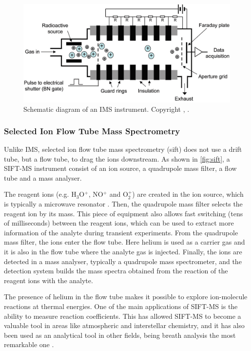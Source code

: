 \begin{figure}%
\centering
    \includegraphics[width=0.65\linewidth]{pics/ims.png}
    \caption{Schematic diagram of an IMS instrument. Copyright \textcopyright  \citeauthor{ellis2013proton},  \citeyear{ellis2013proton}.}
    \label{fig:ims}
\end{figure}












\subsubsection{Selected Ion Flow Tube Mass Spectrometry}
Unlike IMS, selected ion flow tube mass spectrometry (\acrshort{sift}) does not use a drift tube, but a flow tube, to drag the ions downstream. As shown in \autoref{fig:sift}, a SIFT-MS instrument consist of an ion source, a quadrupole mass filter, a flow tube and a mass analyser.

The reagent ions (e.g. H$_3$O$^+$, NO$^+$ and O$_2^+$) are created in the ion source, which is typically a microwave resonator \cite{smith2005selected}.
Then, the quadrupole mass filter  selects the reagent ion by its mass. This piece of equipment also allows fast switching (tens of milliseconds) between the reagent ions, which can be used to extract more information of the analyte during transient experiments. From the quadrupole mass filter, the ions enter the flow tube. Here helium is used as a carrier gas and it is also in the flow tube where the analyte gas is injected. Finally, the ions are detected in a mass analyser, typically a quadrupole mass spectrometer, and the detection system builds the mass spectra obtained from the reaction of the reagent ions with the analyte.



The presence of helium in the flow tube makes it possible to explore ion-molecule reactions at thermal energies. One of the main applications of SIFT-MS is the ability to measure reaction coefficients. This has allowed SIFT-MS to become a valuable tool in areas like atmospheric and interstellar chemistry, and it has also been used as an analytical tool in other fields, being breath analysis the most remarkable one \cite{turner2006longitudinal}.

